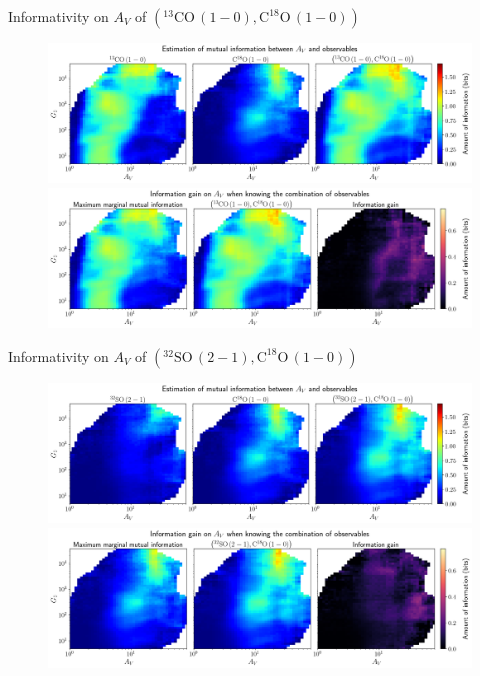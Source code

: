 \documentclass{beamer}
\begin{document}
\begin{frame}{Informativity on $A_V$ of $\left(\mathrm{^{13}CO\,(1-0)},\mathrm{C^{18}O\,(1-0)}\right)$}
    \begin{figure}
        \centering
        \includegraphics[width=0.95\linewidth]{../mi/av__13co10_c18o10_mi.png}
        \vfill
        \includegraphics[width=0.95\linewidth]{../mi/av__13co10_c18o10_mi_gain.png}
    \end{figure}
\end{frame}

\begin{frame}{Informativity on $A_V$ of $\left(\mathrm{^{32}SO\,(2-1)},\mathrm{C^{18}O\,(1-0)}\right)$}
    \begin{figure}
        \centering
        \includegraphics[width=0.95\linewidth]{../mi/av__32so21_c18o10_mi.png}
        \vfill
        \includegraphics[width=0.95\linewidth]{../mi/av__32so21_c18o10_mi_gain.png}
    \end{figure}
\end{frame}
\end{document}
